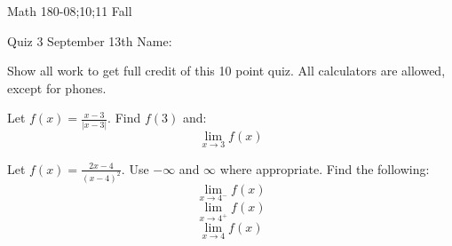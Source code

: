 \documentclass[11pt,epsfig]{article}
\begin{document}
Math 180-08;10;11 Fall

Quiz 3 September 13th \hspace{1.9in} {Name:} {\underline {\hspace{2.5in}}}
\vspace{2pc}

Show all work to get full credit of this 10 point quiz. All calculators are allowed, except for phones.
\vspace{2pc}

\begin{problem}{5}
Let $f(x) = \frac{x-3}{|x-3|}$. Find $f(3)$ and:
\begin{equation*}
\lim_{x\to 3} f(x)
\end{equation*}
\vfill
\end{problem}

\begin{problem}{5}
Let $f(x) = \frac{2x-4}{(x-4)^2}$. Use $-\infty$ and $\infty$ where appropriate. Find the following:
\begin{equation*}
\lim_{x\to 4^-} f(x)
\end{equation*}
\begin{equation*}
\lim_{x\to 4^+} f(x)
\end{equation*}
\begin{equation*}
\lim_{x\to 4} f(x)
\end{equation*}
\vfill
\end{problem}




\showpoints
\end{document}
